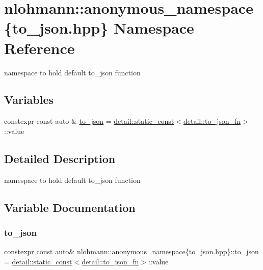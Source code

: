 \hypertarget{namespacenlohmann_1_1anonymous__namespace_02to__json_8hpp_03}{}\section{nlohmann\+:\+:anonymous\+\_\+namespace\{to\+\_\+json.\+hpp\} Namespace Reference}
\label{namespacenlohmann_1_1anonymous__namespace_02to__json_8hpp_03}


namespace to hold default {\ttfamily to\+\_\+json} function  


\subsection*{Variables}
\begin{DoxyCompactItemize}
\item 
constexpr const auto \& \hyperlink{namespacenlohmann_1_1anonymous__namespace_02to__json_8hpp_03_a3cf8d817622a3ecdd3dcce222deb7535}{to\+\_\+json} = \hyperlink{structnlohmann_1_1detail_1_1static__const}{detail\+::static\+\_\+const}$<$\hyperlink{structnlohmann_1_1detail_1_1to__json__fn}{detail\+::to\+\_\+json\+\_\+fn}$>$\+::value
\end{DoxyCompactItemize}


\subsection{Detailed Description}
namespace to hold default {\ttfamily to\+\_\+json} function 

\subsection{Variable Documentation}
\mbox{\label{namespacenlohmann_1_1anonymous__namespace_02to__json_8hpp_03_a3cf8d817622a3ecdd3dcce222deb7535}} 
\subsubsection{\texorpdfstring{to\+\_\+json}{to\_json}}
{\footnotesize\ttfamily constexpr const auto\& nlohmann\+::anonymous\+\_\+namespace\{to\+\_\+json.\+hpp\}\+::to\+\_\+json = \hyperlink{structnlohmann_1_1detail_1_1static__const}{detail\+::static\+\_\+const}$<$\hyperlink{structnlohmann_1_1detail_1_1to__json__fn}{detail\+::to\+\_\+json\+\_\+fn}$>$\+::value}

